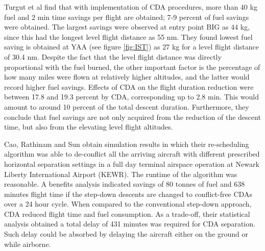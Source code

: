\documentclass{aer1315-pretty}
\begin{document}
Turgut et al \cite{Enis:2010}find that with implementation of CDA procedures, more than 40 kg fuel and 2 min time savings per flight are obtained;  7-9 percent of fuel savings were obtained. The largest savings were observed at entry point BIG as 44 kg, since this had the longest level flight distance as 55 nm. They found lowest fuel saving is obtained at YAA (see figure \ref{fig:IST}) as 27 kg for a level flight distance of 30.4 nm. Despite the fact that the level flight distance was directly proportional with the fuel burned, the other important factor is the percentage of how many miles were flown at relatively higher altitudes, and the latter would record higher fuel savings.  Effects of CDA on the flight duration reduction were between 17.8 and 19.3 percent by CDA, corresponding up to 2.8 min. This would amount to around 10 percent of the total descent duration.  Furthermore, they conclude that fuel savings are not only acquired from the reduction of the descent time, but also from the elevating level flight altitudes.\par


Cao, Rathinam and Sun \cite{Cao:2011} obtain simulation results in which their re-scheduling algorithm was able to de-conflict all the arriving aircraft with different prescribed horizontal separation settings in a full day terminal airspace operation at Newark Liberty International Airport (KEWR). The runtime of the algorithm was reasonable. A benefits analysis indicated savings of 80 tonnes of fuel and 638 minutes flight time if the step-down descents are changed to conflict-free CDAs over a 24 hour cycle. When compared to the conventional step-down approach, CDA reduced flight time and fuel consumption. As a trade-off, their statistical analysis obtained a total delay of 431 minutes was required for CDA separation. Such delay could be absorbed by delaying the aircraft either on the ground or while airborne. \par
\end{document}
